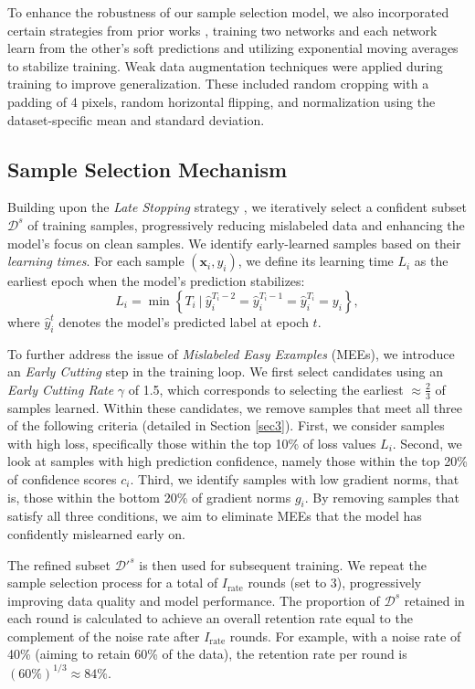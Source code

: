 To enhance the robustness of our sample selection model, we also incorporated certain strategies from prior works \cite{linlearning, li2024regroup}, training two networks and each network learn from the other's soft predictions and utilizing exponential moving averages to stabilize training. Weak data augmentation techniques were applied during training to improve generalization. These included random cropping with a padding of 4 pixels, random horizontal flipping, and normalization using the dataset-specific mean and standard deviation. 


\subsection{Sample Selection Mechanism}

Building upon the \emph{Late Stopping} strategy \cite{yuan2023late}, we iteratively select a confident subset $\mathcal{D}^s$ of training samples, progressively reducing mislabeled data and enhancing the model's focus on clean samples.
We identify early-learned samples based on their \emph{learning times}. For each sample $(\mathbf{x}_i, y_i)$, we define its learning time $L_i$ as the earliest epoch when the model's prediction stabilizes:
\begin{equation}
L_i = \min \left\{ T_i \ \big| \ \hat{y}_i^{T_i-2} = \hat{y}_i^{T_i-1} = \hat{y}_i^{T_i} = y_i \right\},
\label{eq16}
\end{equation}
where $\hat{y}_i^t$ denotes the model's predicted label at epoch $t$.

To further address the issue of \emph{Mislabeled Easy Examples} (MEEs), we introduce an \emph{Early Cutting} step in the training loop. We first select candidates using an \emph{Early Cutting Rate} $\gamma$ of 1.5, which corresponds to selecting the earliest $\approx \frac{2}{3}$ of samples learned. Within these candidates, we remove samples that meet all three of the following criteria (detailed in Section \ref{sec3}). First, we consider samples with high loss, specifically those within the top 10\% of loss values $L_i$. Second, we look at samples with high prediction confidence, namely those within the top 20\% of confidence scores $c_i$. Third, we identify samples with low gradient norms, that is, those within the bottom 20\% of gradient norms $g_i$. By removing samples that satisfy all three conditions, we aim to eliminate MEEs that the model has confidently mislearned early on.

The refined subset $\mathcal{D}'^s$ is then used for subsequent training. We repeat the sample selection process for a total of $I_{\text{rate}}$ rounds (set to 3), progressively improving data quality and model performance. The proportion of $\mathcal{D}^s$ retained in each round is calculated to achieve an overall retention rate equal to the complement of the noise rate after $I_{\text{rate}}$ rounds. For example, with a noise rate of 40\% (aiming to retain 60\% of the data), the retention rate per round is $(60\%)^{1/3} \approx 84\%$.


